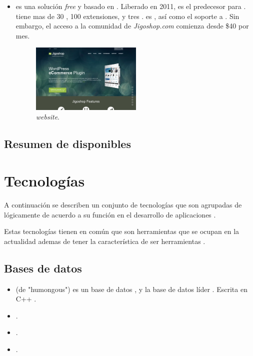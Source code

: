 \begin{itemize}
	\item \textbf{\nameJigoshop} es una solución \ecommerce \textit{free} y \opensource basado en \wordPress. Liberado en 2011, \nameJigoshop es el predecesor para \nameWooCommerce. \nameJigoshop tiene mas de 30   \themes, 100 extensiones, y tres \theme \frameworks. \nameJigoshop es  \free, así como el soporte a \wordPressOrg. Sin embargo, el acceso a la comunidad de \textit{Jigoshop.com} comienza desde \$40 por mes.

	\begin{figure}[H]
		\centering
		\includegraphics[width=0.5\textwidth]{figuras/cap1/JigoshopWebsite.jpg}
		\caption{\nameJigoshop \textit{website}\cite{online_Jigoshop}.}
	\end{figure}

\end{itemize}


\subsection{Resumen de \frameworks disponibles}



\section{Tecnologías }\label{cap:estadoArte:tecnologias}
A continuación se describen un conjunto de tecnologías que son agrupadas de lógicamente de acuerdo a su función en el desarrollo de aplicaciones \web.

Estas tecnologías tienen en común que son herramientas que se ocupan en la actualidad ademas de tener la característica de ser herramientas \opensource. 

\subsection{Bases de datos}
\begin{itemize}
	\item \textbf{\mongodb} (de "humongous") es un base de datos \documentoriented \opensource, y la base de datos líder \nosql. Escrita en C++ \cite{technology_mongodb}.
	
	\item \textbf{\mysql}.
	
	\item \textbf{\postgresql}.
	
	\item \textbf{\sqlite}.
\end{itemize}

